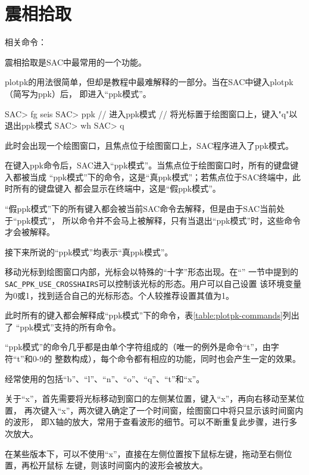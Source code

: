 \section{震相拾取}
\label{sec:phase-picking}

相关命令：

震相拾取是SAC中最常用的一个功能。

plotpk的用法很简单，但却是教程中最难解释的一部分。当在SAC中键入plotpk（简写为ppk）后，
即进入``ppk模式''。

\begin{SACCode}
SAC> fg seis
SAC> ppk        // 进入ppk模式
// 将光标置于绘图窗口上，键入"q"以退出ppk模式
SAC> wh
SAC> q
\end{SACCode}
此时会出现一个绘图窗口，且焦点位于绘图窗口上，SAC程序进入了ppk模式。

\begin{Tips}
在键入ppk命令后，SAC进入``ppk模式''。当焦点位于绘图窗口时，所有的键盘键入都被当成
``ppk模式''下的命令，这是``真ppk模式''；若焦点位于SAC终端中，此时所有的键盘键入
都会显示在终端中，这是``假ppk模式''。

``假ppk模式''下的所有键入都会被当前SAC命令去解释，但是由于SAC当前处于``ppk模式''，
所以命令并不会马上被解释，只有当退出``ppk模式''时，这些命令才会被解释。

接下来所说的``ppk模式''均表示``真ppk模式''。
\end{Tips}

移动光标到绘图窗口内部，光标会以特殊的``十字''形态出现。在``''
一节中提到的\lstinline{SAC_PPK_USE_CROSSHAIRS}可以控制该光标的形态。用户可以自己设置
该环境变量为0或1，找到适合自己的光标形态。个人较推荐设置其值为1。

此时所有的键入都会解释成``ppk模式''下的命令，表\ref{table:plotpk-commands}列出了
``ppk模式''支持的所有命令。

``ppk模式''的命令几乎都是由单个字符组成的（唯一的例外是命令``t''，由字符``t''和0-9的
整数构成），每个命令都有相应的功能，同时也会产生一定的效果。

经常使用的包括``b''、``l''、``n''、``o''、``q''、``t''和``x''。

关于``x''，首先需要将光标移动到窗口的左侧某位置，键入``x''，再向右移动至某位置，
再次键入``x''，两次键入确定了一个时间窗，绘图窗口中将只显示该时间窗内的波形，
即X轴的放大，常用于查看波形的细节。可以不断重复此步骤，进行多次放大。

在某些版本下，可以不使用``x''，直接在左侧位置按下鼠标左键，拖动至右侧位置，再松开鼠标
左键，则该时间窗内的波形会被放大。

